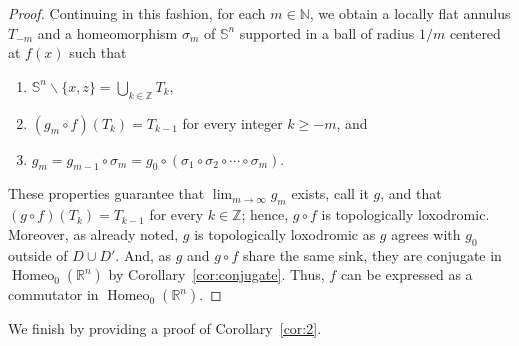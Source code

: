 \documentclass[microtype]{gtpart}
\newcommand{\br}{\mathbb{R}}
\newcommand{\bz}{\mathbb Z}
\newcommand{\bn}{\mathbb N}
\newcommand{\ssm}{\smallsetminus}
\DeclareMathOperator{\Homeo}{Homeo}
\theoremstyle{definition}
\numberwithin{equation}{section}
\begin{document}
\begin{proof}


Continuing in this fashion, for each \( m \in \bn \), we obtain a  locally flat annulus \( T_{-m} \) and a homeomorphism \( \sigma_m \) of \( \mathbb S^n \) supported in a ball of radius \( 1/m \) centered at \( f(x) \) such that
\begin{enumerate}[(1)]
\item \( \mathbb S^n \ssm \{ x,z\} = \bigcup_{k\in\bz} T_k \),
\item \( (g_m\circ f)(T_k) = T_{k-1} \) for every integer \( k \geq -m \), and
\item \( g_m = g_{m-1}\circ \sigma_m = g_0 \circ (\sigma_1 \circ \sigma_{2} \circ \cdots \circ \sigma_m) \).
\end{enumerate}
These properties guarantee that \( \lim_{m\to\infty} g_m \) exists, call it \( g \), and that \( (g \circ f)(T_k)= T_{k-1} \) for every \( k \in \bz \); hence, \( g\circ f \) is topologically loxodromic. 
Moreover, as already noted,  \( g \) is topologically loxodromic as \( g \) agrees with \( g_0 \) outside of \( D \cup D' \). 
And, as \( g \) and \( g\circ f \) share the same sink, they are conjugate in \( \Homeo_0(\br^n) \) by Corollary~\ref{cor:conjugate}.
Thus, \( f \) can be expressed as a commutator in \( \Homeo_0(\br^n) \).
\end{proof}

We finish by providing a proof of Corollary~\ref{cor:2}.
\end{document}
